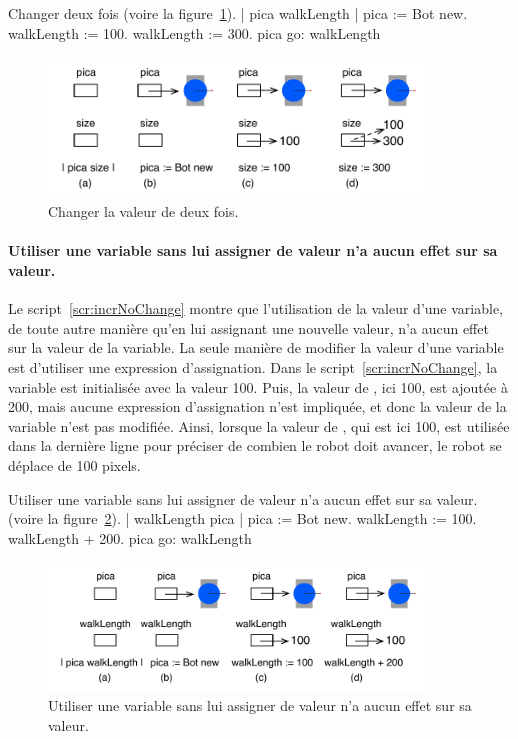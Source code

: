 \documentclass[a4paper,10pt,twoside]{book}
\begin{document}
\begin{script}[incr5]{Changer  deux fois (voire la figure~\ref{fig:boxThree}).}
	| pica walkLength | 
	pica := Bot new. 
	walkLength := 100. 
	walkLength := 300. 
	pica go: walkLength 
\end{script}

\begin{figure}[h]
	\centerline{\includegraphics[width=10cm]{boxThree}}
	\caption{Changer la valeur de  deux fois.\label{fig:boxThree}}
\end{figure}

\newpage
\paragraph{Utiliser une variable sans lui assigner de valeur n'a aucun effet sur sa valeur.}
Le script~\ref{scr:incrNoChange} montre que l'utilisation de la valeur d'une variable, de toute autre mani\`ere qu'en lui assignant une nouvelle valeur, n'a aucun effet sur la valeur de la variable. La seule mani\`ere de modifier la valeur d'une variable est d'utiliser une expression d'assignation. Dans le script~\ref{scr:incrNoChange}, la variable  est initialis\'ee avec la valeur 100. Puis, la valeur de , ici 100, est ajout\'ee \`a 200, mais aucune expression d'assignation n'est impliqu\'ee, et donc la valeur de la variable n'est pas modifi\'ee. Ainsi, lorsque la valeur de , qui est ici 100, est utilis\'ee dans la derni\`ere ligne pour pr\'eciser de combien le robot doit avancer, le robot se d\'eplace de 100 pixels.

\begin{script}[incrNoChange]{Utiliser une variable sans lui assigner de valeur n'a aucun effet sur sa valeur.  (voire la figure~\ref{fig:boxNoChange}).}
	| walkLength pica | 
	pica := Bot new. 
	walkLength := 100. 
	walkLength + 200. 
	pica go: walkLength 
\end{script}

\begin{figure}[h]
	\centerline{\includegraphics[width=10cm]{boxNoChange2}}
	\caption{Utiliser une variable sans lui assigner de valeur n'a aucun effet sur sa valeur.   
	\label{fig:boxNoChange}}
\end{figure}
\end{document}
